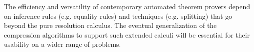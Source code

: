 \documentclass{llncs}
\begin{document}
The efficiency and versatility of contemporary automated theorem provers depend on inference rules (e.g. equality rules) and techniques (e.g. splitting) that go beyond the pure resolution calculus. The eventual generalization of the compression algorithms to support such extended calculi will be essential for their usability on a wider range of problems.



\begin{footnotesize}
%


\end{footnotesize}


\appendix

%
%
\end{document}
